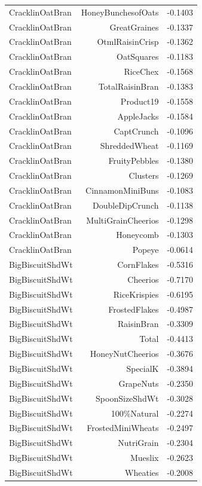 \begin{longtable}{@{}lrr@{}}
CracklinOatBran & HoneyBunchesofOats & -0.1403 \\
CracklinOatBran & GreatGraines & -0.1337 \\
CracklinOatBran & OtmlRaisinCrisp & -0.1362 \\
CracklinOatBran & OatSquares & -0.1183 \\
CracklinOatBran & RiceChex & -0.1568 \\
CracklinOatBran & TotalRaisinBran & -0.1383 \\
CracklinOatBran & Product19 & -0.1558 \\
CracklinOatBran & AppleJacks & -0.1584 \\
CracklinOatBran & CaptCrunch & -0.1096 \\
CracklinOatBran & ShreddedWheat & -0.1169 \\
CracklinOatBran & FruityPebbles & -0.1380 \\
CracklinOatBran & Clusters & -0.1269 \\
CracklinOatBran & CinnamonMiniBuns & -0.1083 \\
CracklinOatBran & DoubleDipCrunch & -0.1138 \\
CracklinOatBran & MultiGrainCheerios & -0.1298 \\
CracklinOatBran & Honeycomb & -0.1303 \\
CracklinOatBran & Popeye & -0.0614 \\
BigBiscuitShdWt & CornFlakes & -0.5316 \\
BigBiscuitShdWt & Cheerios & -0.7170 \\
BigBiscuitShdWt & RiceKrispies & -0.6195 \\
BigBiscuitShdWt & FrostedFlakes & -0.4987 \\
BigBiscuitShdWt & RaisinBran & -0.3309 \\
BigBiscuitShdWt & Total & -0.4413 \\
BigBiscuitShdWt & HoneyNutCheerios & -0.3676 \\
BigBiscuitShdWt & SpecialK & -0.3894 \\
BigBiscuitShdWt & GrapeNuts & -0.2350 \\
BigBiscuitShdWt & SpoonSizeShdWt & -0.3028 \\
BigBiscuitShdWt & 100\%Natural & -0.2274 \\
BigBiscuitShdWt & FrostedMiniWheats & -0.2497 \\
BigBiscuitShdWt & NutriGrain & -0.2304 \\
BigBiscuitShdWt & Mueslix & -0.2623 \\
BigBiscuitShdWt & Wheaties & -0.2008 \\

\end{longtable}
